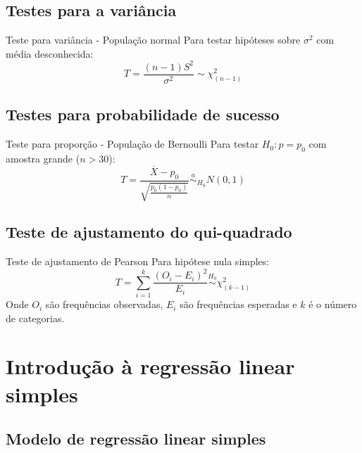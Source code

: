 \documentclass[a4paper,12pt]{article}
\begin{document}
\subsection{Testes para a variância}

\begin{formulabox}{Teste para variância - População normal}
Para testar hipóteses sobre $\sigma^2$ com média desconhecida:
\begin{equation}\label{formula31}\tag{Fórmula 31}
    T = \frac{(n-1)S^2}{\sigma^2} \sim \chi^2_{(n-1)}
\end{equation}
\end{formulabox}

\subsection{Testes para probabilidade de sucesso}

\begin{formulabox}{Teste para proporção - População de Bernoulli}
Para testar $H_0: p = p_0$ com amostra grande ($n > 30$):
\begin{equation}\label{formula32}\tag{Fórmula 32}
    T = \frac{\overline{X} - p_0}{\sqrt{\frac{p_0(1-p_0)}{n}}} \overset{a}{\sim}_{H_0} N(0, 1)
\end{equation}
\end{formulabox}

\subsection{Teste de ajustamento do qui-quadrado}

\begin{formulabox}{Teste de ajustamento de Pearson}
Para hipótese nula simples:
\begin{equation}\label{formula33}\tag{Fórmula 33}
    T = \sum_{i=1}^k \frac{(O_i - E_i)^2}{E_i} \overset{H_0}{\sim} \chi^2_{(k-1)}
\end{equation}
Onde $O_i$ são frequências observadas, $E_i$ são frequências esperadas e $k$ é o número de categorias.
\end{formulabox}

\newpage

\section{\color{sectioncolor}Introdução à regressão linear simples}
\subsection{Modelo de regressão linear simples}
\end{document}

